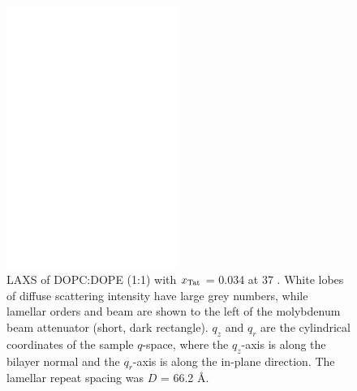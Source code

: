 \begin{figure}[htbp]
  \centering
  \includegraphics[width=0.5\textwidth]{figures/Tat/NFIT_results/dopcdope1to1}
  \caption{LAXS of DOPC:DOPE (1:1) with $x_\textrm{Tat}$ = 0.034 at 37 \textcelsius. 
  White lobes of diffuse scattering intensity have large grey numbers, while
  lamellar orders and beam are shown to the left of the
  molybdenum beam attenuator (short, dark rectangle). $q_z$ and $q_r$ are the 
  cylindrical coordinates of the sample $q$-space, where the $q_z$-axis is along 
  the bilayer normal and the $q_r$-axis is along the in-plane direction. 
  The lamellar repeat spacing was $D$ = 66.2 \AA.}
  \label{fig:figure1}
\end{figure}

